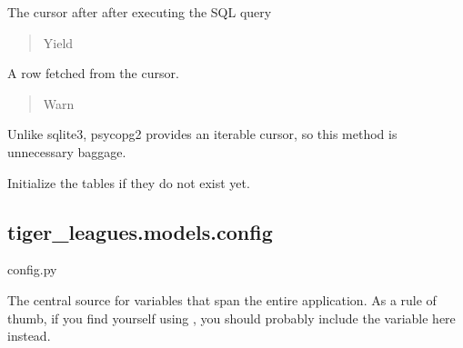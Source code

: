 \documentclass[letterpaper,10pt,english]{sphinxmanual}
\begin{document}
\begin{fulllineitems}
\begin{fulllineitems}
\begin{quote}
\begin{description}
\end{description}\end{quote}

The cursor after after executing the SQL query
\begin{quote}\begin{description}
\item[{Yield}] \leavevmode
{}

\end{description}\end{quote}

A row fetched from the cursor.
\begin{quote}\begin{description}
\item[{Warn}] \leavevmode
{}

\end{description}\end{quote}

Unlike sqlite3, psycopg2 provides an iterable cursor, so this method 
is unnecessary baggage.

\end{fulllineitems}


\begin{fulllineitems}
\label{\detokenize{tiger_leagues/models/readme:tiger_leagues.models.db_model.Database.launch}}
Initialize the tables if they do not exist yet.

\end{fulllineitems}


\end{fulllineitems}



\subsection{tiger\_leagues.models.config}
\label{\detokenize{tiger_leagues/models/readme:module-tiger_leagues.models.config}}\label{\detokenize{tiger_leagues/models/readme:tiger-leagues-models-config}}
config.py

The central source for variables that span the entire application. As a rule of 
thumb, if you find yourself using , you should probably include the 
variable here instead.
\end{document}
